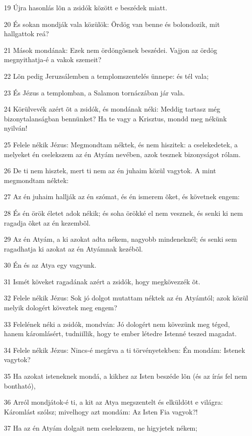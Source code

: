 \par 19 Újra hasonlás lõn a zsidók között e beszédek miatt.
\par 20 És sokan mondják vala közülök: Ördög van benne és bolondozik, mit hallgattok reá?
\par 21 Mások mondának: Ezek nem ördöngõsnek beszédei. Vajjon az ördög megnyithatja-é a vakok szemeit?
\par 22 Lõn pedig Jeruzsálemben a templomszentelés ünnepe: és tél vala;
\par 23 És Jézus a templomban, a Salamon tornáczában jár vala.
\par 24 Körülvevék azért õt a zsidók, és mondának néki: Meddig tartasz még bizonytalanságban bennünket? Ha te vagy a Krisztus, mondd meg nékünk nyilván!
\par 25 Felele nékik Jézus: Megmondtam néktek, és nem hiszitek: a cselekedetek, a melyeket én cselekszem az én Atyám nevében, azok tesznek bizonyságot rólam.
\par 26 De ti nem hisztek, mert ti nem az én juhaim közül vagytok. A mint megmondtam néktek:
\par 27 Az én juhaim hallják az én szómat, és én ismerem õket, és követnek engem:
\par 28 És én örök életet adok nékik; és soha örökké el nem vesznek, és senki ki nem ragadja  õket az én kezembõl.
\par 29 Az én Atyám, a ki azokat adta nékem, nagyobb mindeneknél; és senki sem ragadhatja ki azokat az én Atyámnak kezébõl.
\par 30 Én és az Atya egy vagyunk.
\par 31 Ismét köveket ragadának azért a zsidók, hogy megkövezzék õt.
\par 32 Felele nékik Jézus: Sok jó dolgot mutattam néktek az én Atyámtól; azok közül melyik dologért köveztek meg engem?
\par 33 Felelének néki a zsidók, mondván: Jó dologért nem kövezünk meg téged, hanem káromlásért, tudniillik, hogy te ember létedre Istenné teszed magadat.
\par 34 Felele nékik Jézus: Nincs-é megírva a ti törvényetekben: Én mondám: Istenek vagytok?
\par 35 Ha azokat isteneknek mondá, a kikhez az Isten beszéde lõn (és az írás fel nem bontható),
\par 36 Arról mondjátok-é ti, a kit az Atya megszentelt és elküldött e világra: Káromlást szólsz; mivelhogy azt mondám: Az Isten Fia vagyok?!
\par 37 Ha az én Atyám dolgait nem cselekszem, ne higyjetek nékem;

